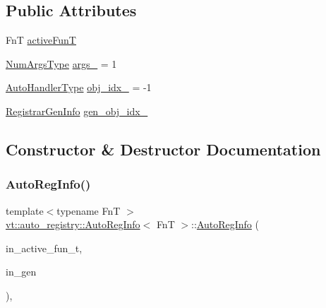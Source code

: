 \subsection*{Public Attributes}
\begin{DoxyCompactItemize}
\item 
FnT \hyperlink{structvt_1_1auto__registry_1_1_auto_reg_info_a0ce7e02e8be36c770dead608e23709c6}{active\+FunT}
\item 
\hyperlink{namespacevt_1_1auto__registry_aebda1d9d765bc9147dc654ad0712c936}{Num\+Args\+Type} \hyperlink{structvt_1_1auto__registry_1_1_auto_reg_info_a861ecaa80da263959457a5429c3a3716}{args\+\_\+} = 1
\item 
\hyperlink{namespacevt_1_1auto__registry_ae295e18699146815bb7d7674594d95d7}{Auto\+Handler\+Type} \hyperlink{structvt_1_1auto__registry_1_1_auto_reg_info_ab44c4c795cdffbc56e6e65ffab728013}{obj\+\_\+idx\+\_\+} = -\/1
\item 
\hyperlink{structvt_1_1auto__registry_1_1_registrar_gen_info}{Registrar\+Gen\+Info} \hyperlink{structvt_1_1auto__registry_1_1_auto_reg_info_a5803e0771ae948d91d73a4721fc01fcb}{gen\+\_\+obj\+\_\+idx\+\_\+}
\end{DoxyCompactItemize}


\subsection{Constructor \& Destructor Documentation}
\mbox{\label{structvt_1_1auto__registry_1_1_auto_reg_info_a57928f8fb49b3a015d27840b4328be44}} 
\subsubsection{\texorpdfstring{Auto\+Reg\+Info()}{AutoRegInfo()}\hspace{0.1cm}{\footnotesize\ttfamily [1/2]}}
{\footnotesize\ttfamily template$<$typename FnT $>$ \\
\hyperlink{structvt_1_1auto__registry_1_1_auto_reg_info}{vt\+::auto\+\_\+registry\+::\+Auto\+Reg\+Info}$<$ FnT $>$\+::\hyperlink{structvt_1_1auto__registry_1_1_auto_reg_info}{Auto\+Reg\+Info} (\begin{DoxyParamCaption}\item[{FnT const \&}]{in\+\_\+active\+\_\+fun\+\_\+t,  }\item[{\hyperlink{structvt_1_1auto__registry_1_1_registrar_gen_info}{Registrar\+Gen\+Info}}]{in\+\_\+gen }\end{DoxyParamCaption})\hspace{0.3cm}{\ttfamily [inline]}, {\ttfamily [explicit]}}

